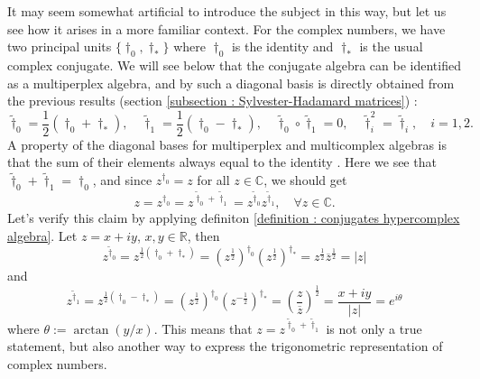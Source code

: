 \documentclass{article}
\begin{document}

It may seem somewhat artificial to introduce the subject in this way, but let us see how it arises in a more familiar context. For the complex numbers, we have two principal units $\{\dagger_0, \dagger_*\}$ where $\dagger_0$ is the identity and $\dagger_*$ is the usual complex conjugate. We will see below that the conjugate algebra can be identified as a multiperplex algebra, and by such a diagonal basis is directly obtained from the previous results (section \ref{subsection : Sylvester-Hadamard matrices}) :
$$ \tilde \dagger_0 = \frac{1}{2}(\dagger_0 + \dagger_*), \quad \tilde \dagger_1 = \frac{1}{2}(\dagger_0 - \dagger_*), \quad \tilde \dagger_0 \circ \tilde\dagger_1 = 0, \quad \tilde \dagger_i^2 = \tilde \dagger_i, \quad i = 1,2. $$
A property of the diagonal bases for multiperplex and multicomplex algebras is that the sum of their elements always equal to the identity \cite{courchesneAndTremblay2025}. Here we see that $\tilde \dagger_0 + \tilde \dagger_1 = \dagger_0$, and since $z^{\dagger_0} = z$ for all $z \in \mathbb{C}$, we should get
$$ z = z^{\dagger_0} = z^{\tilde\dagger_0 + \tilde \dagger_1} = z^{\tilde \dagger_0} z^{\tilde \dagger_1}, \quad \forall z \in \mathbb{C}. $$
Let's verify this claim by applying definiton \ref{definition : conjugates hypercomplex algebra}. Let $z = x + iy$, $x,y \in \mathbb{R}$, then
$$ z^{\tilde \dagger_0} = z^{\frac{1}{2}(\dagger_0 + \dagger_*)} = (z^{\frac{1}{2}})^{\dagger_0}(z^{\frac{1}{2}})^{\dagger_*} = z^{\frac{1}{2}}\overline{z}^{\frac{1}{2}} = |z| $$
and
$$ z^{\tilde\dagger_1} = z^{\frac{1}{2}(\dagger_0 - \dagger_*)} = (z^{\frac{1}{2}})^{\dagger_0}(z^{-\frac{1}{2}})^{\dagger_*} = \left(\frac{z}{\overline{z}}\right)^{\frac{1}{2}} = \frac{x + iy}{|z|} = e^{i\theta} $$
where $\theta := \arctan(y/x)$. This means that $z=z^{\tilde\dagger_0 + \tilde\dagger_1}$ is not only a true statement, but also another way to express the trigonometric representation of complex numbers.
\end{document}
